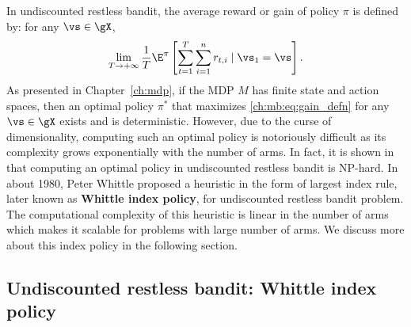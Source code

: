 In undiscounted restless bandit, the average reward or gain of policy $\pi$ is defined by: for any $\vs\in\gX$,
\begin{equation}
    \label{ch:mb:eq:gain_defn}
    \lim_{T\to+\infty}\frac1T \E^\pi\left[ \sum_{t=1}^{T} \sum_{i=1}^nr_{t,i} \mid \vs_1=\vs\right].
\end{equation}
As presented in Chapter~\ref{ch:mdp}, if the MDP $M$ has finite state and action spaces, then an optimal policy $\pi^*$ that maximizes \eqref{ch:mb:eq:gain_defn} for any $\vs\in\gX$ exists and is deterministic.
However, due to the curse of dimensionality, computing such an optimal policy is notoriously difficult as its complexity grows exponentially with the number of arms.
In fact, it is shown in \cite{papadimitriou1994complexity} that computing an optimal policy in undiscounted restless bandit is NP-hard.
In about 1980, Peter Whittle proposed a heuristic in the form of largest index rule, later known as \textbf{Whittle index policy}, for undiscounted restless bandit problem.
The computational complexity of this heuristic is linear in the number of arms which makes it scalable for problems with large number of arms.  
We discuss more about this index policy in the following section.


\subsection{Undiscounted restless bandit: Whittle index policy}
\label{ch:mb:ssec:whittle_idx}


